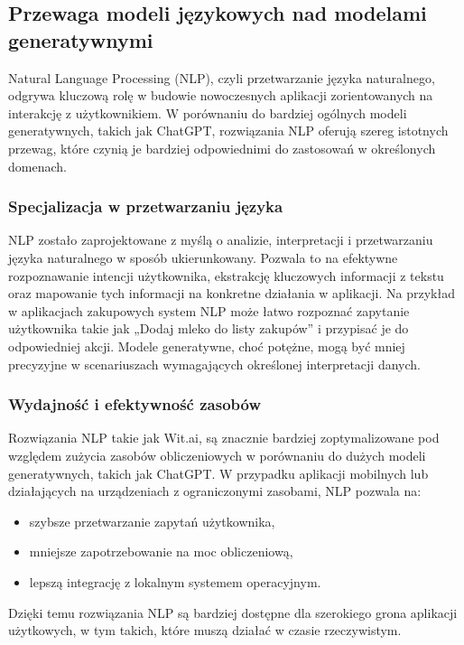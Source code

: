 \subsection{Przewaga modeli językowych nad modelami generatywnymi}
Natural Language Processing (NLP), czyli przetwarzanie języka naturalnego, odgrywa kluczową rolę w budowie nowoczesnych aplikacji zorientowanych na interakcję z użytkownikiem. W porównaniu do bardziej ogólnych modeli generatywnych, takich jak ChatGPT, rozwiązania NLP oferują szereg istotnych przewag, które czynią je bardziej odpowiednimi do zastosowań w określonych domenach.

\subsubsection{Specjalizacja w przetwarzaniu języka}
NLP zostało zaprojektowane z myślą o analizie, interpretacji i przetwarzaniu języka naturalnego w sposób ukierunkowany. Pozwala to na efektywne rozpoznawanie intencji użytkownika, ekstrakcję kluczowych informacji z tekstu oraz mapowanie tych informacji na konkretne działania w aplikacji. Na przykład w aplikacjach zakupowych system NLP może łatwo rozpoznać zapytanie użytkownika takie jak „Dodaj mleko do listy zakupów” i przypisać je do odpowiedniej akcji. Modele generatywne, choć potężne, mogą być mniej precyzyjne w scenariuszach wymagających określonej interpretacji danych.

\subsubsection{Wydajność i efektywność zasobów}
Rozwiązania NLP takie jak Wit.ai, są znacznie bardziej zoptymalizowane pod względem zużycia zasobów obliczeniowych w porównaniu do dużych modeli generatywnych, takich jak ChatGPT. W przypadku aplikacji mobilnych lub działających na urządzeniach z ograniczonymi zasobami, NLP pozwala na:
\begin{itemize}
    \item szybsze przetwarzanie zapytań użytkownika,
    \item mniejsze zapotrzebowanie na moc obliczeniową,
    \item lepszą integrację z lokalnym systemem operacyjnym.
\end{itemize}

Dzięki temu rozwiązania NLP są bardziej dostępne dla szerokiego grona aplikacji użytkowych, w tym takich, które muszą działać w czasie rzeczywistym.

